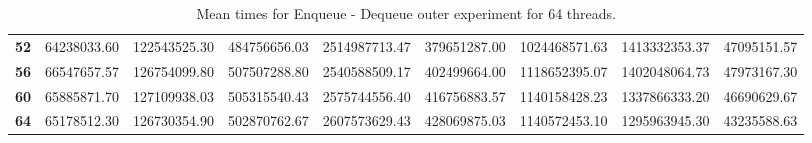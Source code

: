 \begin{table}[!ht]
{\begin{tabular}{lrrrrrrrr}
\textbf{52} & 64238033.60 & 122543525.30 & 484756656.03 & 2514987713.47 & 379651287.00 & 1024468571.63 & 1413332353.37 & 47095151.57 \\
\textbf{56} & 66547657.57 & 126754099.80 & 507507288.80 & 2540588509.17 & 402499664.00 & 1118652395.07 & 1402048064.73 & 47973167.30 \\
\textbf{60} & 65885871.70 & 127109938.03 & 505315540.43 & 2575744556.40 & 416756883.57 & 1140158428.23 & 1337866333.20 & 46690629.67 \\
\textbf{64} & 65178512.30 & 126730354.90 & 502870762.67 & 2607573629.43 & 428069875.03 & 1140572453.10 & 1295963945.30 & 43235588.63 \\
\bottomrule
\end{tabular}}
\caption{Mean times for Enqueue - Dequeue outer experiment for 64 threads.}
\label{table:appx64-outer-enq-deq-times}
\end{table}
